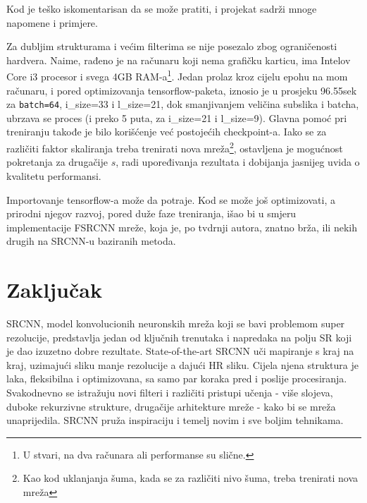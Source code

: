 \documentclass[12pt]{report}
\numberwithin{equation}{section}
\begin{document}
   Kod je teško iskomentarisan da se može pratiti, i projekat sadrži mnoge napomene i primjere.
  
   Za dubljim strukturama i većim filterima se nije posezalo zbog ograničenosti hardvera. Naime, rađeno je na računaru koji nema grafičku karticu, ima Intelov Core i3 procesor i svega 4GB RAM-a\footnote{U stvari, na dva računara ali performanse su slične.}. Jedan prolaz kroz cijelu epohu na mom računaru, i pored optimizovanja tensorflow-paketa, iznosio je u prosjeku 96.55sek za \texttt{batch=64}, i\_size=33 i l\_size=21, dok smanjivanjem veličina subslika i batcha, ubrzava se proces (i preko 5 puta, za i\_size=21 i l\_size=9). Glavna pomoć pri treniranju takođe je bilo korišćenje već postojećih checkpoint-a. Iako se za različiti faktor skaliranja treba trenirati nova mreža\footnote{Kao kod uklanjanja šuma, kada se za različiti nivo šuma, treba trenirati nova mreža}, ostavljena je mogućnost pokretanja za drugačije $s$, radi upoređivanja rezultata i dobijanja jasnijeg uvida o kvalitetu performansi. 
  
 Importovanje tensorflow-a može da potraje. Kod se može još optimizovati, a prirodni njegov razvoj, pored duže faze treniranja, išao bi u smjeru implementacije FSRCNN mreže, koja je, po tvdrnji autora, znatno brža, ili nekih drugih na SRCNN-u baziranih metoda. 

  
  
 
    


\chapter{Zaključak}\label{ch2}  
  
  SRCNN, model konvolucionih neuronskih mreža koji se bavi problemom super rezolucije, predstavlja jedan od ključnih trenutaka i napredaka na polju SR koji je dao izuzetno dobre rezultate. State-of-the-art SRCNN uči mapiranje s kraj na kraj, uzimajući sliku manje rezolucije a dajući HR sliku. Cijela njena struktura je laka, fleksibilna i optimizovana, sa samo par koraka pred i poslije procesiranja. Svakodnevno se istražuju novi filteri i različiti pristupi učenja - više slojeva, duboke rekurzivne strukture, drugačije arhitekture mreže - kako bi se mreža unaprijedila. SRCNN pruža inspiraciju i temelj novim i sve boljim tehnikama.
 
\end{document}
